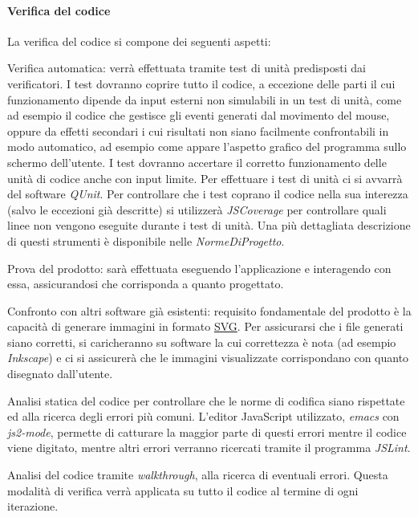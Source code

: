 \paragraph{Verifica del codice}
La verifica del codice si compone dei seguenti aspetti:
\begin{elenconumerato}[\textbf{}]{\subsubsecindent}
\item Verifica automatica: verr\`a effettuata tramite test di unit\`a predisposti dai verificatori. I test dovranno coprire tutto il codice, a eccezione delle parti il cui funzionamento dipende da input esterni non simulabili in un test di unit\`a, come ad esempio il codice che gestisce gli eventi generati dal movimento del mouse, oppure da effetti secondari i cui risultati non siano facilmente confrontabili in modo automatico, ad esempio come appare l'aspetto grafico del programma sullo schermo dell'utente. I test dovranno accertare il corretto funzionamento delle unit\`a di codice anche con input limite. Per effettuare i test di unit\`a ci si avvarr\`a del software \textit{QUnit}. Per controllare che i test coprano il codice nella sua interezza (salvo le eccezioni gi\`a descritte) si utilizzer\`a \textit{JSCoverage} per controllare quali linee non vengono eseguite durante i test di unit\`a. Una pi\`u dettagliata descrizione di questi strumenti \`e disponibile nelle \textit{NormeDiProgetto}.
\item Prova del prodotto: sar\`a effettuata eseguendo l'applicazione e interagendo con essa, assicurandosi che corrisponda a quanto progettato.
\item Confronto con altri software gi\`a esistenti: requisito fondamentale del prodotto \`e la capacit\`a di generare immagini in formato \underline{SVG}. Per assicurarsi che i file generati siano corretti, si caricheranno su software la cui correttezza \`e nota (ad esempio \textit{Inkscape}) e ci si assicurer\`a che le immagini visualizzate corrispondano con quanto disegnato dall'utente.
\item Analisi statica del codice per controllare che le norme di codifica siano rispettate ed alla ricerca degli errori pi\`u comuni. L'editor JavaScript utilizzato, \textit{emacs} con \textit{js2-mode}, permette di catturare la maggior parte di questi errori mentre il codice viene digitato, mentre altri errori verranno ricercati tramite il programma \textit{JSLint}.
\item Analisi del codice tramite \textit{walkthrough}, alla ricerca di eventuali errori. Questa modalit\`a di verifica  verr\`a applicata su tutto il codice al termine di ogni iterazione.
\end{elenconumerato}
 
